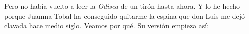 Pero no había vuelto a leer la \emph{Odisea} de un tirón hasta ahora. Y lo he hecho porque Juanma Tobal ha conseguido quitarme la espina que don Luis me dejó clavada hace medio siglo. Veamos por qué. Su versión empieza así:
%
%

